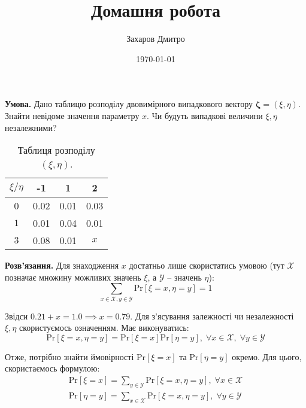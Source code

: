 \documentclass[oneside,solution]{karazin-prob-theory-assign}
\title{Домашня робота}
\author{Захаров Дмитро}
\date{\today}
\begin{document}
\maketitle



\hspace{20px}\textbf{Умова.} Дано таблицю розподілу двовимірного випадкового вектору $\boldsymbol{\zeta} = (\xi,\eta)$. Знайти невідоме значення параметру $x$. Чи будуть випадкові величини $\xi,\eta$ незалежними?

\begin{table}[H]
    \centering
    \begin{tabular}{c|c|c|c}
         $\xi/\eta$ & -1 & 1 & 2  \\ \hline 
         0 & 0.02 & 0.01 & 0.03 \\ \hline
         $1$ & 0.01 & 0.04 & 0.01 \\ \hline
         $3$ & 0.08 & 0.01 & $x$
    \end{tabular}
    \caption{Таблиця розподілу $(\xi,\eta)$.}
    \label{tab:table_1}
\end{table}

\textbf{Розв'язання.} Для знаходження $x$ достатньо лише скористатись умовою (тут $\mathcal{X}$ позначає множину можливих значень $\xi$, а $\mathcal{Y}$ -- значень $\eta$):
\begin{equation}
    \sum_{x \in \mathcal{X}, y \in \mathcal{Y}}\text{Pr}[\xi=x, \eta=y] = 1
\end{equation}

Звідси $0.21+x=1.0 \implies \boxed{x=0.79}$. Для з'ясування залежності чи незалежності $\xi,\eta$ скористуємось означенням. Має виконуватись:
\begin{equation}
    \text{Pr}[\xi = x, \eta = y] = \text{Pr}[\xi=x]\text{Pr}[\eta=y], \; \forall x \in \mathcal{X}, \; \forall y \in \mathcal{Y}
\end{equation}

Отже, потрібно знайти ймовірності $\text{Pr}[\xi=x]$ та $\text{Pr}[\eta=y]$ окремо. Для цього, скористаємось формулою:
\begin{gather}
    \text{Pr}[\xi=x] = \sum_{y \in \mathcal{Y}} \text{Pr}[\xi=x,\eta=y], \; \forall x \in \mathcal{X} \\
    \text{Pr}[\eta=y] = \sum_{x \in \mathcal{X}}\text{Pr}[\xi=x,\eta=y], \; \forall y \in \mathcal{Y}
\end{gather}
\end{document}
